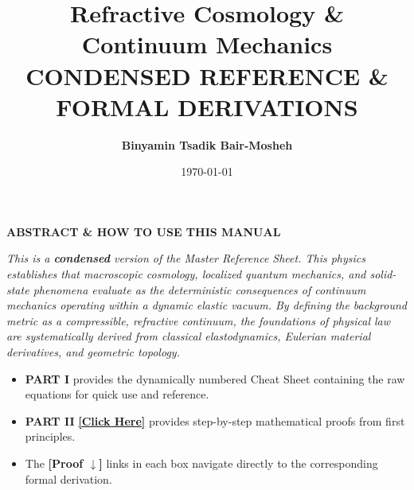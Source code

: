 \titleformat{\subsection}{\large\bfseries\color{darkgray}}{\thesubsection}{0.5em}{}
\titleformat{\subsubsection}{\normalsize\bfseries\color{gray}}{\thesubsubsection}{0.5em}{}

\setlength{\columnsep}{0.6cm}

\setcounter{cheatnum}{0}

\title{\textbf{Refractive Cosmology \& Continuum Mechanics \\ CONDENSED REFERENCE \& FORMAL DERIVATIONS}}
\author{\textbf{Binyamin Tsadik Bair-Mosheh} } %
\date{\today}



\maketitle


\begin{tcolorbox}[colback=gray!5!white, colframe=gray!50!black, arc=1mm, boxrule=0.5pt, left=3mm, right=3mm]
\begin{center}
    \textbf{ABSTRACT \& HOW TO USE THIS MANUAL}
\end{center}
\textit{This is a \textbf{condensed} version of the Master Reference Sheet.
This physics establishes that macroscopic cosmology, localized quantum mechanics, and solid-state phenomena evaluate as the deterministic consequences of continuum mechanics operating within a dynamic elastic vacuum. By defining the background metric as a compressible, refractive continuum, the foundations of physical law are systematically derived from classical elastodynamics, Eulerian material derivatives, and geometric topology.} %
\vspace{0.2cm}
\begin{itemize}[nosep]
    \item \textbf{PART I} provides the dynamically numbered Cheat Sheet containing the raw equations for quick use and reference.
    \item \textbf{PART II} \hyperref[sec:part2]{\textbf{[Click Here]}} provides step-by-step mathematical proofs from first principles. 
    \item The \textbf{[Proof $\downarrow$]} links in each box navigate directly to the corresponding formal derivation.
\end{itemize}
\end{tcolorbox}

